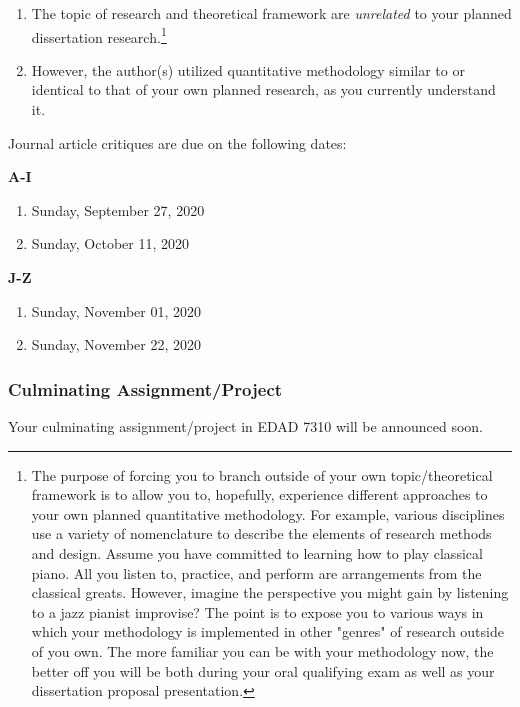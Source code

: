 \documentclass[
]{article}
\providecommand{\tightlist}{%
  \setlength{\itemsep}{0pt}\setlength{\parskip}{0pt}}
\begin{document}
\begin{enumerate}
\def\labelenumi{\arabic{enumi}.}
\tightlist
\item
  The topic of research and theoretical framework are \emph{unrelated}
  to your planned dissertation
  research.\footnote{The purpose of forcing you to branch outside of your own topic/theoretical framework is to allow you to, hopefully, experience different approaches to your own planned quantitative methodology. For example, various disciplines use a variety of nomenclature to describe the elements of research methods and design. Assume you have committed to learning how to play classical piano. All you listen to, practice, and perform are arrangements from the classical greats. However, imagine the perspective you might gain by listening to a jazz pianist improvise? The point is to expose you to various ways in which your methodology is implemented in other "genres" of research outside of you own. The more familiar you can be with your methodology now, the better off you will be both during your oral qualifying exam as well as your dissertation proposal presentation.}
\item
  However, the author(s) utilized quantitative methodology similar to or
  identical to that of your own planned research, as you currently
  understand it.
\end{enumerate}

Journal article critiques are due on the following dates:

\textbf{A-I}

\begin{enumerate}
\def\labelenumi{\arabic{enumi}.}
\tightlist
\item
  Sunday, September 27, 2020
\item
  Sunday, October 11, 2020
\end{enumerate}

\textbf{J-Z}

\begin{enumerate}
\def\labelenumi{\arabic{enumi}.}
\tightlist
\item
  Sunday, November 01, 2020
\item
  Sunday, November 22, 2020
\end{enumerate}

\subsubsection{Culminating Assignment/Project}

Your culminating assignment/project in EDAD 7310 will be announced soon.
\end{document}
